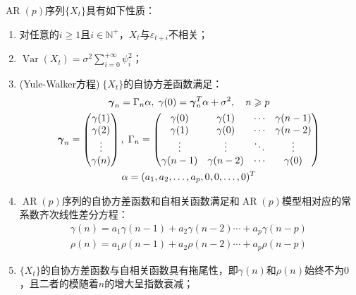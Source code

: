 \begin{property}
	$\operatorname{AR}(p)$序列$\{X_t\}$具有如下性质：
	\begin{enumerate}
		\item 对任意的$i\geqslant1$且$i\in\mathbb{N}^+$，$X_t$与$\varepsilon_{t+i}$不相关；
		\item $\operatorname{Var}(X_t)=\sigma^2\sum\limits_{i=0}^{+\infty}\psi_i^2$；
		\item (Yule-Walker方程)$\;\{X_t\}$的自协方差函数满足：
		\begin{gather*}
			\boldsymbol{\gamma}_n=\Gamma_n\alpha,\;
			\gamma(0)=\boldsymbol{\gamma}_n^T\alpha+\sigma^2,\quad n\geqslant p \\
			\boldsymbol{\gamma}_n=
			\begin{pmatrix}
				\gamma(1) \\
				\gamma(2) \\
				\vdots \\
				\gamma(n)
			\end{pmatrix},\;
			\Gamma_n=
			\begin{pmatrix}
				\gamma(0) & \gamma(1) & \cdots & \gamma(n-1) \\
				\gamma(1) & \gamma(0) & \cdots & \gamma(n-2) \\
				\vdots & \vdots & \ddots & \vdots \\
				\gamma(n-1) & \gamma(n-2) & \cdots & \gamma(0) \\
			\end{pmatrix} \\
			\alpha=(a_1, a_2, \dots, a_{p},0,0,\dots,0)^T
		\end{gather*}
		\item $\operatorname{AR}(p)$序列的自协方差函数和自相关函数满足和$\operatorname{AR}(p)$模型相对应的常系数齐次线性差分方程：
		\begin{gather*}
			\gamma(n)=a_1\gamma(n-1)+a_2\gamma(n-2)\cdots+a_p\gamma(n-p) \\
			\rho(n)=a_1\rho(n-1)+a_2\rho(n-2)\cdots+a_p\rho(n-p)
		\end{gather*}
		\item $\{X_t\}$的自协方差函数与自相关函数具有拖尾性，即$\gamma(n)$和$\rho(n)$始终不为$0$，且二者的模随着$n$的增大呈指数衰减；
	\end{enumerate}
\end{property}
